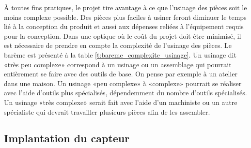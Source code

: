 \begin{table}
   \caption{Barème de la complexité de l'usinage des pièces}
   \label{t:bareme_complexite_usinage}
\end{table}

À toutes fins pratiques, le projet tire avantage à ce que l'usinage des pièces soit le moins complexe possible. Des pièces plus faciles à usiner feront diminuer le temps lié à la conception du produit et aussi aux dépenses reliées à l'équipement requis pour la conception. Dans une optique où le coût du projet doit être minimisé, il est nécessaire de prendre en compte la complexité de l'usinage des pièces. Le barème est présenté à la table \ref{t:bareme_complexite_usinage}. Un usinage dit «très peu complexe» correspond à un usinage ou un assemblage qui pourrait entièrement se faire avec des outils de base. On pense par exemple à un atelier dans une maison. Un usinage «peu complexe» à «complexe» pourrait se réaliser avec l'aide d'outils plus spécialisés, dépendemment du nombre d'outils spécialisés. Un usinage «très complexe» serait fait avec l'aide d'un machiniste ou un autre spécialiste qui devrait travailler plusieurs pièces afin de les assembler.


\subsection{Implantation du capteur}

\begin{table}
   \caption{Évaluation du barème de la facilité de l'implantation du capteur}
   \label{t:bareme_implantation_capteur}
\end{table}

